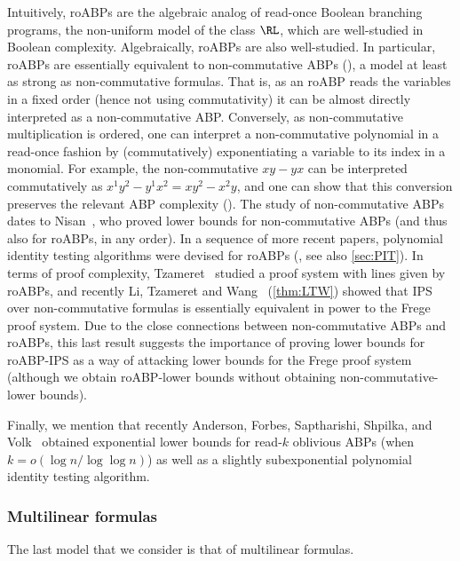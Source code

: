 \documentclass{toc}
\begin{document}
Intuitively, roABPs are the algebraic analog of read-once Boolean branching programs, the non-uniform model of the class $\RL$, which are well-studied in Boolean complexity.  Algebraically, roABPs are also well-studied. In particular, roABPs are essentially equivalent to non-commutative ABPs (\cite{ForbesShpilka13b}), a model at least as strong as non-commutative formulas.  That is, as an roABP reads the variables in a fixed order (hence not using commutativity) it can be almost directly interpreted as a non-commutative ABP\@. Conversely, as non-commutative multiplication is ordered, one can interpret a non-commutative polynomial in a read-once fashion by (commutatively) exponentiating a variable to its index in a monomial.  For example, the non-commutative $xy-yx$ can be interpreted commutatively as $x^1y^2-y^1x^2=xy^2-x^2y$, and one can show that this conversion preserves the relevant ABP complexity (\cite{ForbesShpilka13b}). The study of non-commutative ABPs dates to Nisan~\cite{Nisan91}, who proved lower bounds for non-commutative ABPs (and thus also for roABPs, in any order). In a sequence of more recent papers, polynomial identity testing algorithms were devised for roABPs (\cite{RazShpilka05,ForbesShpilka12,ForbesShpilka13b,ForbesSS14,AgrawalGKS15}, see also \autoref{sec:PIT}). In terms of proof complexity, Tzameret~\cite{Tzameret11} studied a proof system with lines given by roABPs, and recently Li, Tzameret and Wang~\cite{LiTW15} (\autoref{thm:LTW}) showed that IPS over non-commutative formulas is essentially equivalent in power to the Frege proof system.  Due to the close connections between non-commutative ABPs and roABPs, this last result suggests the importance of proving lower bounds for roABP-IPS as a way of attacking lower bounds for the Frege proof system (although
%
we obtain  %
roABP-\lIPS lower bounds without obtaining non-commutative-\lIPS lower bounds).

Finally, we mention that recently Anderson, Forbes, Saptharishi, Shpilka, and Volk~\cite{AndersonFSSV16} obtained exponential lower bounds for read-$k$ oblivious ABPs (when $k=o(\log n/\log\log n)$) as well as a slightly subexponential polynomial identity testing algorithm.

%

\subsubsection{Multilinear formulas}

The last model that we consider is that of multilinear formulas.
\end{document}
